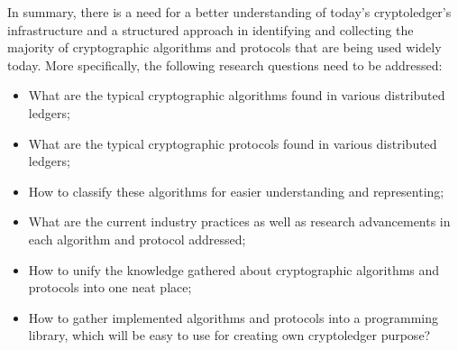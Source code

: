 \documentclass[12pt]{article}
\begin{document}
In summary, there is a need for a better understanding of today's
cryptoledger's infrastructure and a structured approach in identifying and
collecting the majority of cryptographic algorithms and protocols that are
being used widely today. More specifically, the following research questions
need to be addressed:
\begin{itemize}
    \item What are the typical cryptographic algorithms found in various distributed ledgers;
    \item What are the typical cryptographic protocols found in various distributed ledgers;
    \item How to classify these algorithms for easier understanding and representing;
    \item What are the current industry practices as well as research advancements in each algorithm and protocol addressed;
    \item How to unify the knowledge gathered about cryptographic algorithms and protocols into one neat place;
    \item How to gather implemented algorithms and protocols into a programming
          library, which will be easy to use for creating own cryptoledger
          purpose?
\end{itemize}
\end{document}
